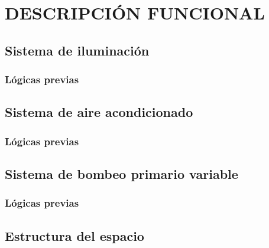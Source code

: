 \chapter{DESCRIPCIÓN FUNCIONAL}
\thispagestyle{empty}

\section{Sistema de iluminación}
\subsection{Lógicas previas}
\section{Sistema de aire acondicionado}
\subsection{Lógicas previas}
\section{Sistema de bombeo primario variable}
\subsection{Lógicas previas}
\section{Estructura del espacio}
